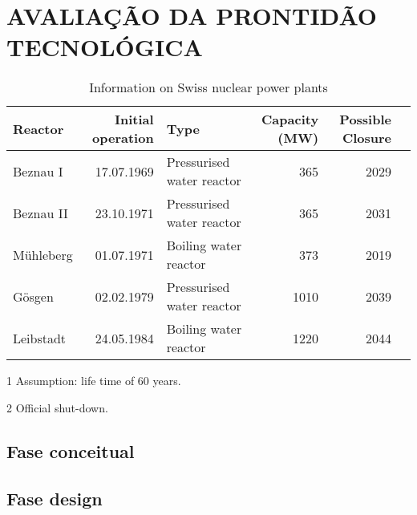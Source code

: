 \chapter{AVALIAÇÃO DA PRONTIDÃO TECNOLÓGICA}
\label{chap:trl}



\begin{table}[!h]
\caption{Information on Swiss nuclear power plants}
  \begin{threeparttable}[t]
  \centering
       \begin{tabular}{lrlrrr}
    \toprule
     Reactor     & Initial operation & Type  & Capacity (MW) & Possible Closure\tnote{1}\\
    \midrule
    Beznau I & 17.07.1969 & Pressurised water reactor & 365   & 2029 \\
    Beznau II & 23.10.1971 & Pressurised water reactor & 365   & 2031 \\
    Mühleberg & 01.07.1971 & Boiling water reactor & 373   & 2019\tnote{2}\\
    Gösgen & 02.02.1979 & Pressurised water reactor & 1010  & 2039 \\
    Leibstadt & 24.05.1984 & Boiling water reactor & 1220  & 2044 \\
     \bottomrule
  \end{tabular}
     \begin{tablenotes}
     \item[1] Assumption: life time of 60 years.
     \item[2] Official shut-down.
   \end{tablenotes}
    \end{threeparttable}%
  \label{tab:addlabel}%
\end{table}%

\section{Fase conceitual}
\label{sec:trlconc}

\section{Fase design}
\label{sec:trldesig}


